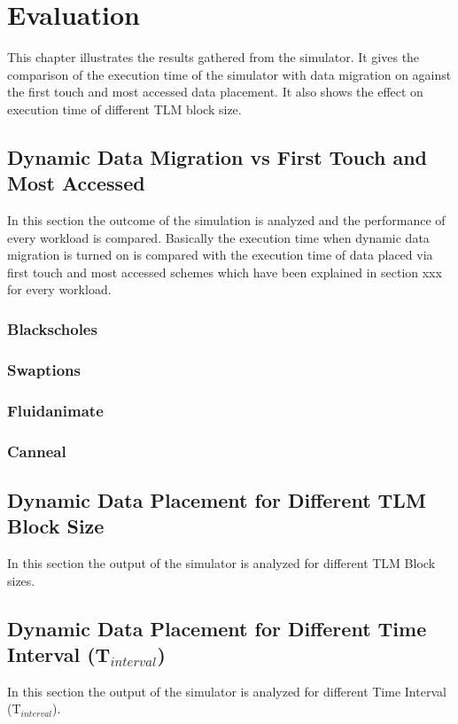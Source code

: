 \documentclass{listhesis}
\begin{document}
\chapter{Evaluation}
This chapter illustrates the results gathered from the simulator. It gives the comparison of the execution time of the simulator with data migration on against the first touch and most accessed data placement. It also shows the effect on execution time of different TLM block size.
\section{Dynamic Data Migration vs First Touch and Most Accessed}
In this section the outcome of the simulation is analyzed and the performance of every workload is compared. Basically the execution time when dynamic data migration is turned on is compared with the execution time of data placed via first touch and most accessed schemes which have been explained in section xxx for every workload.
\subsection{Blackscholes}

\subsection{Swaptions}

\subsection{Fluidanimate}

\subsection{Canneal}


\section{Dynamic Data Placement for Different TLM Block Size}
In this section the output of the simulator is analyzed for different TLM Block sizes. 

\section{Dynamic Data Placement for Different Time Interval (T$_{interval}$)}
In this section the output of the simulator is analyzed for different Time Interval (T$_{interval}$).
\end{document}

